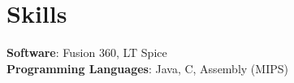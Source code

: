 \section{Skills}
 \begin{itemize}[leftmargin=0.15in, label={}]
    \small{\item{
     \textbf{Software}{: Fusion 360, LT Spice} \\
     \textbf{Programming Languages}{: Java, C, Assembly (MIPS)} \\
    }}
 \end{itemize}

